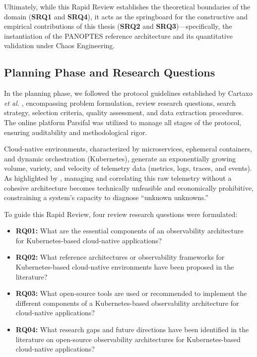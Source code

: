 Ultimately, while this Rapid Review establishes the theoretical boundaries of the domain (\textbf{SRQ1} and \textbf{SRQ4}), it acts as the springboard for the constructive and empirical contributions of this thesis (\textbf{SRQ2} and \textbf{SRQ3})---specifically, the instantiation of the PANOPTES reference architecture and its quantitative validation under Chaos Engineering.

\subsection{Planning Phase and Research Questions}
In the planning phase, we followed the protocol guidelines established by Cartaxo \textit{et al.} \cite{cartaxo_2018}, encompassing problem formulation, review research questions, search strategy, selection criteria, quality assessment, and data extraction procedures. The online platform Parsifal was utilized to manage all stages of the protocol, ensuring auditability and methodological rigor.

Cloud-native environments, characterized by microservices, ephemeral containers, and dynamic orchestration (Kubernetes), generate an exponentially growing volume, variety, and velocity of telemetry data (metrics, logs, traces, and events). As highlighted by \cite{sridharan_2018}, managing and correlating this raw telemetry without a cohesive architecture becomes technically unfeasible and economically prohibitive, constraining a system's capacity to diagnose ``unknown unknowns.''

To guide this Rapid Review, four review research questions were formulated:
\begin{itemize}
    \item \textbf{RQ01:} What are the essential components of an observability architecture for Kubernetes-based cloud-native applications?
    \item \textbf{RQ02:} What reference architectures or observability frameworks for Kubernetes-based cloud-native environments have been proposed in the literature?
    \item \textbf{RQ03:} What open-source tools are used or recommended to implement the different components of a Kubernetes-based observability architecture for cloud-native applications?
    \item \textbf{RQ04:} What research gaps and future directions have been identified in the literature on open-source observability architectures for Kubernetes-based cloud-native applications?
\end{itemize}

